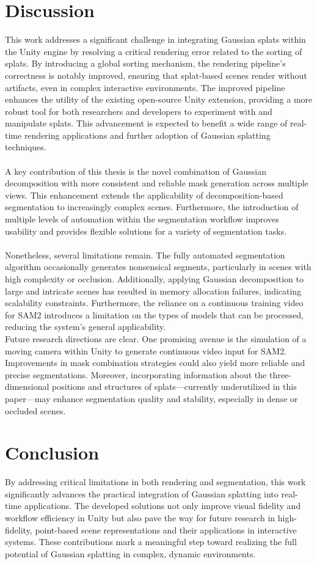 \documentclass[twocolumn]{article}
\begin{document}
	\section{Discussion}
This work addresses a significant challenge in integrating Gaussian splats within the Unity engine by resolving a critical rendering error related to the sorting of splats. By introducing a global sorting mechanism, the rendering pipeline’s correctness is notably improved, ensuring that splat-based scenes render without artifacts, even in complex interactive environments. The improved pipeline enhances the utility of the existing open-source Unity extension, providing a more robust tool for both researchers and developers to experiment with and manipulate splats. This advancement is expected to benefit a wide range of real-time rendering applications and further adoption of Gaussian splatting techniques.
\\\\
A key contribution of this thesis is the novel combination of Gaussian decomposition with more consistent and reliable mask generation across multiple views. This enhancement extends the applicability of decomposition-based segmentation to increasingly complex scenes. Furthermore, the introduction of multiple levels of automation within the segmentation workflow improves usability and provides flexible solutions for a variety of segmentation tasks.
\\\\
Nonetheless, several limitations remain. The fully automated segmentation algorithm occasionally generates nonsensical segments, particularly in scenes with high complexity or occlusion. Additionally, applying Gaussian decomposition to large and intricate scenes has resulted in memory allocation failures, indicating scalability constraints. Furthermore, the reliance on a continuous training video for SAM2 introduces a limitation on the types of models that can be processed, reducing the system’s general applicability.
\\Future research directions are clear. One promising avenue is the simulation of a moving camera within Unity to generate continuous video input for SAM2. Improvements in mask combination strategies could also yield more reliable and precise segmentations. Moreover, incorporating information about the three-dimensional positions and structures of splats—currently underutilized in this paper—may enhance segmentation quality and stability, especially in dense or occluded scenes.
	\section{Conclusion}
By addressing critical limitations in both rendering and segmentation, this work significantly advances the practical integration of Gaussian splatting into real-time applications. The developed solutions not only improve visual fidelity and workflow efficiency in Unity but also pave the way for future research in high-fidelity, point-based scene representations and their applications in interactive systems. These contributions mark a meaningful step toward realizing the full potential of Gaussian splatting in complex, dynamic environments.


\end{document}
